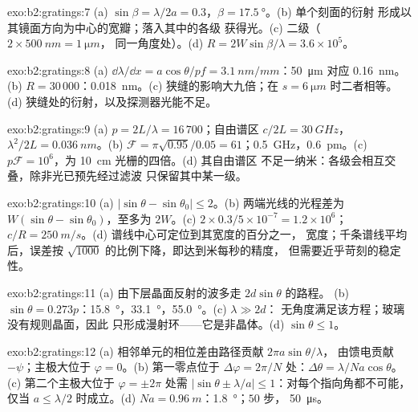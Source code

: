 \begin{solution}{exo:b2:gratings:7}
(a) $\sin\beta = \lambda/2a = 0.3$，$\beta = \qty{17.5}{\degree}$。(b) 单个刻面的衍射
形成以其镜面方向为中心的宽瓣；落入其中的各级
获得光。(c) 二级（$2 \times \qty{500}{nm} = \qty{1}{\micro m}$，
同一角度处）。(d) $R = 2W\sin\beta/\lambda = 3.6 \times 10^5$。
\end{solution}

\begin{solution}{exo:b2:gratings:8}
(a) $\dd\lambda/\dd x = a\cos\theta/pf = \qty{3.1}{nm/mm}$：\qty{50}{\micro m} 对应 \qty{0.16}{nm}。(b)
$R = 30\,000$：\qty{0.018}{nm}。(c) 狭缝的影响大九倍；在 $s = \qty{6}{\micro m}$ 时二者相等。
(d) 狭缝处的衍射，以及探测器光能不足。
\end{solution}

\begin{solution}{exo:b2:gratings:9}
(a) $p = 2L/\lambda = 16\,700$；自由谱区 $c/2L = \qty{30}{GHz}$，$\lambda^2/2L = \qty{0.036}{nm}$。(b) $\mathcal F
= \pi\sqrt{0.95}/0.05 = 61$；\qty{0.5}{GHz}，\qty{0.6}{pm}。(c) $p\mathcal F = 10^6$，为
\qty{10}{cm} 光栅的四倍。(d) 其自由谱区
不足一纳米：各级会相互交叠，除非光已预先经过滤波
只保留其中某一级。
\end{solution}

\begin{solution}{exo:b2:gratings:10}
(a) $|\sin\theta - \sin\theta_0| \le 2$。(b) 两端光线的光程差为
$W(\sin\theta - \sin\theta_0)$，至多为 $2W$。(c) $2 \times 0.3/5 \times 10^{-7} = 1.2 \times 10^6$；$c/R
= \qty{250}{m/s}$。(d) 谱线中心可定位到其宽度的百分之一，
宽度；千条谱线平均后，误差按 $\sqrt{1000}$ 的比例下降，即达到米每秒的精度，
但需要近乎苛刻的稳定性。
\end{solution}

\begin{solution}{exo:b2:gratings:11}
(a) 由下层晶面反射的波多走 $2d\sin\theta$ 的路程。
(b) $\sin\theta = 0.273p$：\qty{15.8}{\degree}，\qty{33.1}{\degree}，\qty{55.0}{\degree}。(c) $\lambda \gg 2d$：
无角度满足该方程；玻璃没有规则晶面，因此
只形成漫射环——它是非晶体。(d) $\sin\theta \le 1$。
\end{solution}

\begin{solution}{exo:b2:gratings:12}
(a) 相邻单元的相位差由路径贡献 $2\pi a\sin\theta/\lambda$，
由馈电贡献 $-\psi$；主极大位于 $\varphi = 0$。(b) 第一零点位于
$\Delta\varphi = 2\pi/N$ 处：$\Delta\theta = \lambda/Na\cos\theta$。(c) 第二个主极大位于
$\varphi = \pm2\pi$ 处需 $|\sin\theta \pm \lambda/a| \le 1$：对每个指向角都不可能，
仅当 $a \le \lambda/2$ 时成立。(d) $Na = \qty{0.96}{m}$：\qty{1.8}{\degree}；$50$ 步，
\qty{50}{\micro s}。
\end{solution}

